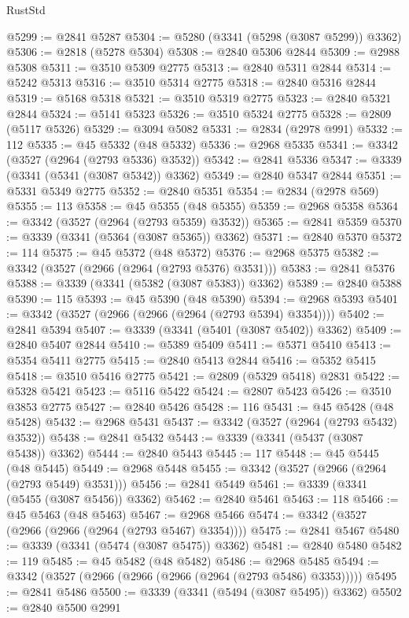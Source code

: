 \begin{lexlean}{RustStd}
\begin{coremodule}
@5299 := @2841 @5287
@5304 := @5280 (@3341 (@5298 (@3087 @5299)) @3362)
@5306 := @2818 (@5278 @5304)
@5308 := @2840 @5306 @2844
@5309 := @2988 @5308
@5311 := @3510 @5309 @2775
@5313 := @2840 @5311 @2844
@5314 := @5242 @5313
@5316 := @3510 @5314 @2775
@5318 := @2840 @5316 @2844
@5319 := @5168 @5318
@5321 := @3510 @5319 @2775
@5323 := @2840 @5321 @2844
@5324 := @5141 @5323
@5326 := @3510 @5324 @2775
@5328 := @2809 (@5117 @5326)
@5329 := @3094 @5082
@5331 := @2834 (@2978 @991)
@5332 := 112
@5335 := @45 @5332 (@48 @5332)
@5336 := @2968 @5335
@5341 := @3342 (@3527 (@2964 (@2793 @5336) @3532))
@5342 := @2841 @5336
@5347 := @3339 (@3341 (@5341 (@3087 @5342)) @3362)
@5349 := @2840 @5347 @2844
@5351 := @5331 @5349 @2775
@5352 := @2840 @5351
@5354 := @2834 (@2978 @569)
@5355 := 113
@5358 := @45 @5355 (@48 @5355)
@5359 := @2968 @5358
@5364 := @3342 (@3527 (@2964 (@2793 @5359) @3532))
@5365 := @2841 @5359
@5370 := @3339 (@3341 (@5364 (@3087 @5365)) @3362)
@5371 := @2840 @5370
@5372 := 114
@5375 := @45 @5372 (@48 @5372)
@5376 := @2968 @5375
@5382 := @3342 (@3527 (@2966 (@2964 (@2793 @5376) @3531)))
@5383 := @2841 @5376
@5388 := @3339 (@3341 (@5382 (@3087 @5383)) @3362)
@5389 := @2840 @5388
@5390 := 115
@5393 := @45 @5390 (@48 @5390)
@5394 := @2968 @5393
@5401 := @3342 (@3527 (@2966 (@2966 (@2964 (@2793 @5394) @3354))))
@5402 := @2841 @5394
@5407 := @3339 (@3341 (@5401 (@3087 @5402)) @3362)
@5409 := @2840 @5407 @2844
@5410 := @5389 @5409
@5411 := @5371 @5410
@5413 := @5354 @5411 @2775
@5415 := @2840 @5413 @2844
@5416 := @5352 @5415
@5418 := @3510 @5416 @2775
@5421 := @2809 (@5329 @5418) @2831
@5422 := @5328 @5421
@5423 := @5116 @5422
@5424 := @2807 @5423
@5426 := @3510 @3853 @2775
@5427 := @2840 @5426
@5428 := 116
@5431 := @45 @5428 (@48 @5428)
@5432 := @2968 @5431
@5437 := @3342 (@3527 (@2964 (@2793 @5432) @3532))
@5438 := @2841 @5432
@5443 := @3339 (@3341 (@5437 (@3087 @5438)) @3362)
@5444 := @2840 @5443
@5445 := 117
@5448 := @45 @5445 (@48 @5445)
@5449 := @2968 @5448
@5455 := @3342 (@3527 (@2966 (@2964 (@2793 @5449) @3531)))
@5456 := @2841 @5449
@5461 := @3339 (@3341 (@5455 (@3087 @5456)) @3362)
@5462 := @2840 @5461
@5463 := 118
@5466 := @45 @5463 (@48 @5463)
@5467 := @2968 @5466
@5474 := @3342 (@3527 (@2966 (@2966 (@2964 (@2793 @5467) @3354))))
@5475 := @2841 @5467
@5480 := @3339 (@3341 (@5474 (@3087 @5475)) @3362)
@5481 := @2840 @5480
@5482 := 119
@5485 := @45 @5482 (@48 @5482)
@5486 := @2968 @5485
@5494 := @3342 (@3527 (@2966 (@2966 (@2966 (@2964 (@2793 @5486) @3353)))))
@5495 := @2841 @5486
@5500 := @3339 (@3341 (@5494 (@3087 @5495)) @3362)
@5502 := @2840 @5500 @2991

\end{coremodule}
\end{lexlean}
